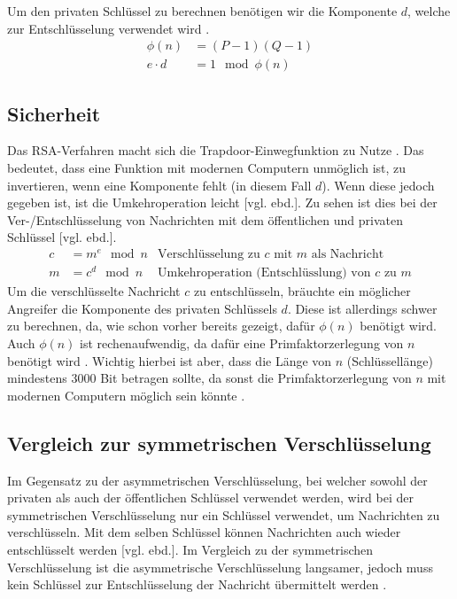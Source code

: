 \documentclass[a4paper,ngerman, headheight=28pt,12pt]{scrartcl}
\newcommand{\vcite}[1]{\cite[vgl.][]{#1}}
\newcommand{\vebd}{[vgl. ebd.]}
\begin{document}
Um den privaten Schlüssel zu berechnen benötigen wir die Komponente $d$, welche zur Entschlüsselung verwendet wird \vcite{RsaEncryptionDecryption}.
\begin{equation*}
  \begin{aligned}
    \phi(n)   & = (P-1)(Q-1)     \\
    e \cdot d & = 1 \mod \phi(n)
  \end{aligned}
\end{equation*}

\subsection{Sicherheit}
Das RSA-Verfahren macht sich die Trapdoor-Einwegfunktion zu Nutze \vcite{RsaTrapdoor}. Das bedeutet, dass eine Funktion mit modernen Computern unmöglich ist, zu invertieren, wenn eine Komponente fehlt (in diesem Fall $d$). Wenn diese jedoch gegeben ist, ist die Umkehroperation leicht \vebd. Zu sehen ist dies bei der Ver-/Entschlüsselung von Nachrichten mit dem öffentlichen und privaten Schlüssel \vebd.
\begin{equation*}
  \begin{aligned}
    c & = m^e \mod n & \text{Verschlüsselung zu $c$ mit $m$ als Nachricht}    \\
    m & = c^d \mod n & \text{Umkehroperation (Entschlüsslung) von $c$ zu $m$}
  \end{aligned}
\end{equation*}
Um die verschlüsselte Nachricht $c$ zu entschlüsseln, bräuchte ein möglicher Angreifer die Komponente des privaten Schlüssels $d$. Diese ist allerdings schwer zu berechnen, da, wie schon vorher bereits gezeigt, dafür $\phi(n)$ benötigt wird. Auch $\phi(n)$ ist rechenaufwendig, da dafür eine Primfaktorzerlegung von $n$ benötigt wird \vcite{EulersTotientFunction}. Wichtig hierbei ist aber, dass die Länge von $n$ (Schlüssellänge) mindestens 3000 Bit betragen sollte, da sonst die Primfaktorzerlegung von $n$ mit modernen Computern möglich sein könnte \vcite{RsaKeyLength}.

\subsection{Vergleich zur symmetrischen Verschlüsselung}
Im Gegensatz zu der asymmetrischen Verschlüsselung, bei welcher sowohl der privaten als auch der öffentlichen Schlüssel verwendet werden, wird bei der symmetrischen Verschlüsselung nur ein Schlüssel verwendet, um Nachrichten zu verschlüsseln\vcite{GeneralSymmetricCryptography}. Mit dem selben Schlüssel können Nachrichten auch wieder entschlüsselt werden \vebd.
Im Vergleich zu der symmetrischen Verschlüsselung ist die asymmetrische Verschlüsselung langsamer, jedoch muss kein Schlüssel zur Entschlüsselung der Nachricht übermittelt werden \vcite{RsaAESAnalysis}.
\end{document}
